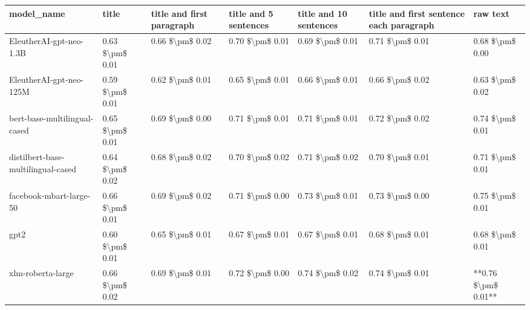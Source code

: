 \begin{tabular}{lllllll}
\toprule
                        model\_name &           title & title and first paragraph & title and 5 sentences & title and 10 sentences & title and first sentence each paragraph &            raw text \\
\midrule
           EleutherAI-gpt-neo-1.3B & 0.63 \$\textbackslash pm\$ 0.01 &           0.66 \$\textbackslash pm\$ 0.02 &       0.70 \$\textbackslash pm\$ 0.01 &        0.69 \$\textbackslash pm\$ 0.01 &                         0.71 \$\textbackslash pm\$ 0.01 &     0.68 \$\textbackslash pm\$ 0.00 \\
           EleutherAI-gpt-neo-125M & 0.59 \$\textbackslash pm\$ 0.01 &           0.62 \$\textbackslash pm\$ 0.01 &       0.65 \$\textbackslash pm\$ 0.01 &        0.66 \$\textbackslash pm\$ 0.01 &                         0.66 \$\textbackslash pm\$ 0.02 &     0.63 \$\textbackslash pm\$ 0.02 \\
      bert-base-multilingual-cased & 0.65 \$\textbackslash pm\$ 0.01 &           0.69 \$\textbackslash pm\$ 0.00 &       0.71 \$\textbackslash pm\$ 0.01 &        0.71 \$\textbackslash pm\$ 0.01 &                         0.72 \$\textbackslash pm\$ 0.02 &     0.74 \$\textbackslash pm\$ 0.01 \\
distilbert-base-multilingual-cased & 0.64 \$\textbackslash pm\$ 0.02 &           0.68 \$\textbackslash pm\$ 0.02 &       0.70 \$\textbackslash pm\$ 0.02 &        0.71 \$\textbackslash pm\$ 0.02 &                         0.70 \$\textbackslash pm\$ 0.01 &     0.71 \$\textbackslash pm\$ 0.01 \\
           facebook-mbart-large-50 & 0.66 \$\textbackslash pm\$ 0.01 &           0.69 \$\textbackslash pm\$ 0.02 &       0.71 \$\textbackslash pm\$ 0.00 &        0.73 \$\textbackslash pm\$ 0.01 &                         0.73 \$\textbackslash pm\$ 0.00 &     0.75 \$\textbackslash pm\$ 0.01 \\
                              gpt2 & 0.60 \$\textbackslash pm\$ 0.01 &           0.65 \$\textbackslash pm\$ 0.01 &       0.67 \$\textbackslash pm\$ 0.01 &        0.67 \$\textbackslash pm\$ 0.01 &                         0.68 \$\textbackslash pm\$ 0.01 &     0.68 \$\textbackslash pm\$ 0.01 \\
                 xlm-roberta-large & 0.66 \$\textbackslash pm\$ 0.02 &           0.69 \$\textbackslash pm\$ 0.01 &       0.72 \$\textbackslash pm\$ 0.00 &        0.74 \$\textbackslash pm\$ 0.02 &                         0.74 \$\textbackslash pm\$ 0.01 & **0.76 \$\textbackslash pm\$ 0.01** \\
\bottomrule
\end{tabular}
